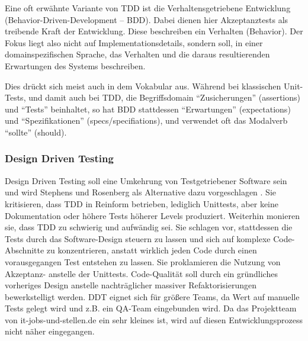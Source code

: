   Eine oft erwähnte Variante von TDD ist die Verhaltensgetriebene Entwicklung (Behavior-Driven-Development -- BDD). Dabei dienen hier Akzeptanztests als treibende Kraft der Entwicklung. Diese beschreiben ein Verhalten (Behavior). Der Fokus liegt also nicht auf Implementationsdetails, sondern soll, in einer domainspezifischen Sprache, das Verhalten und die daraus resultierenden Erwartungen des Systems beschreiben.
  
  Dies drückt sich meist auch in dem Vokabular aus. Während bei klassischen Unit-Tests, und damit auch bei TDD, die Begriffsdomain  "`Zusicherungen"' (assertions) und "`Tests"' beinhaltet, so hat BDD stattdessen "`Erwartungen"' (expectations) und "`Spezifikationen"' (specs/specifiations), und verwendet oft das Modalverb "`sollte"' (should).
  
 \subsubsection{Design Driven Testing}
  Design Driven Testing soll eine Umkehrung von Testgetriebener Software sein und wird Stephens und Rosenberg als Alternative dazu vorgeschlagen \citep{stephens_design_2010}. Sie kritisieren, dass TDD in Reinform betrieben, lediglich Unittests, aber keine Dokumentation oder höhere Tests höherer Levels produziert. Weiterhin monieren sie, dass TDD zu schwierig und aufwändig sei. Sie schlagen vor, stattdessen die Tests durch das Software-Design steuern zu lassen und sich auf komplexe Code-Abschnitte zu konzentrieren, anstatt wirklich jeden Code durch einen vorausgegangen Test entstehen zu lassen. Sie proklamieren die Nutzung von Akzeptanz- anstelle der Unittests. Code-Qualität soll durch ein gründliches vorheriges Design anstelle nachträglicher massiver Refaktorisierungen bewerkstelligt werden.
  DDT eignet sich für größere Teams, da Wert auf manuelle Tests gelegt wird und z.B. ein QA-Team eingebunden wird. Da das Projektteam von it-jobs-und-stellen.de ein sehr kleines ist, wird auf diesen Entwicklungsprozess nicht näher eingegangen.